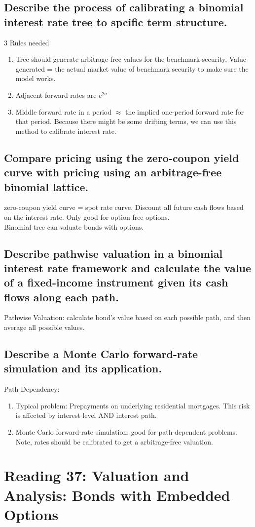 \documentclass{article}
\newcommand{\be}{\begin{enumerate}}
\newcommand{\ee}{\end{enumerate}}
\begin{document}
\subsection{Describe the process of calibrating a binomial interest rate tree to spcific
term structure.}
3 Rules needed
\be
    \item Tree should generate arbitrage-free values for the benchmark security.
    Value generated = the actual market value of benchmark security to make sure the model works.
    \item Adjacent forward rates are $e^{2\sigma}$
    \item Middle forward rate in a period $\approx$ the implied one-period forward rate for that period.
    Because there might be some drifting terms, we can use this method to calibrate interest rate.
\ee
\subsection{Compare pricing using the zero-coupon yield curve with pricing using an
arbitrage-free binomial lattice.}
zero-coupon yield curve = spot rate curve. Discount all future cash flows based on 
the interest rate. Only good for option free options.
\\Binomial tree can valuate bonds with options.
\subsection{Describe pathwise valuation in a binomial interest rate framework and 
calculate the value of a fixed-income instrument given its cash flows along each path.}
Pathwise Valuation: calculate bond's value based on each possible path, and then average
all possible values.
\subsection{Describe a Monte Carlo forward-rate simulation and its application.}
Path Dependency:
\be
    \item Typical problem: Prepayments on underlying residential mortgages. This risk
    is affected by interest level AND interest path.
    \item Monte Carlo forward-rate simulation: good for path-dependent problems. Note, 
    rates should be calibrated to get a arbitrage-free valuation.
\ee


\section{Reading 37: Valuation and Analysis: Bonds with Embedded Options}
\end{document}
